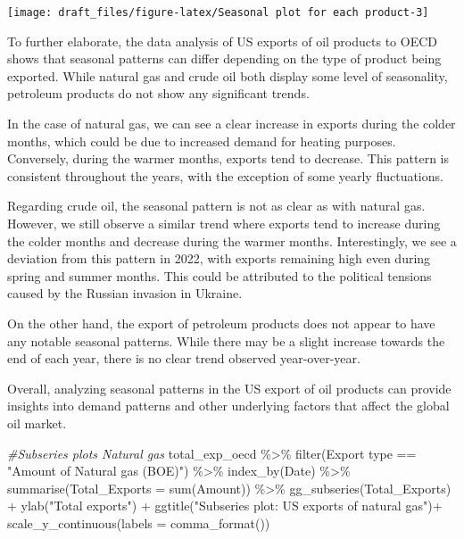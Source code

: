 \documentclass[
]{article}
\newenvironment{Shaded}{\begin{snugshade}}{\end{snugshade}}
\newcommand{\AttributeTok}[1]{\textcolor[rgb]{0.77,0.63,0.00}{#1}}
\newcommand{\CommentTok}[1]{\textcolor[rgb]{0.56,0.35,0.01}{\textit{#1}}}
\newcommand{\FunctionTok}[1]{\textcolor[rgb]{0.00,0.00,0.00}{#1}}
\newcommand{\NormalTok}[1]{#1}
\newcommand{\SpecialCharTok}[1]{\textcolor[rgb]{0.00,0.00,0.00}{#1}}
\newcommand{\StringTok}[1]{\textcolor[rgb]{0.31,0.60,0.02}{#1}}
\begin{document}
\begin{center}\texttt{[image: draft\_files/figure-latex/Seasonal plot for each product-3]} \end{center}

To further elaborate, the data analysis of US exports of oil products to
OECD shows that seasonal patterns can differ depending on the type of
product being exported. While natural gas and crude oil both display
some level of seasonality, petroleum products do not show any
significant trends.

In the case of natural gas, we can see a clear increase in exports
during the colder months, which could be due to increased demand for
heating purposes. Conversely, during the warmer months, exports tend to
decrease. This pattern is consistent throughout the years, with the
exception of some yearly fluctuations.

Regarding crude oil, the seasonal pattern is not as clear as with
natural gas. However, we still observe a similar trend where exports
tend to increase during the colder months and decrease during the warmer
months. Interestingly, we see a deviation from this pattern in 2022,
with exports remaining high even during spring and summer months. This
could be attributed to the political tensions caused by the Russian
invasion in Ukraine.

On the other hand, the export of petroleum products does not appear to
have any notable seasonal patterns. While there may be a slight increase
towards the end of each year, there is no clear trend observed
year-over-year.

Overall, analyzing seasonal patterns in the US export of oil products
can provide insights into demand patterns and other underlying factors
that affect the global oil market.

\begin{Shaded}
\begin{Highlighting}[]
\CommentTok{\#Subseries plots Natural gas}
\NormalTok{total\_exp\_oecd }\SpecialCharTok{\%\textgreater{}\%} \FunctionTok{filter}\NormalTok{(}\StringTok{\textasciigrave{}}\AttributeTok{Export type}\StringTok{\textasciigrave{}} \SpecialCharTok{==} \StringTok{"Amount of Natural gas (BOE)"}\NormalTok{) }\SpecialCharTok{\%\textgreater{}\%} 
  \FunctionTok{index\_by}\NormalTok{(Date) }\SpecialCharTok{\%\textgreater{}\%} 
  \FunctionTok{summarise}\NormalTok{(}\AttributeTok{Total\_Exports =} \FunctionTok{sum}\NormalTok{(}\StringTok{\textasciigrave{}}\AttributeTok{Amount}\StringTok{\textasciigrave{}}\NormalTok{)) }\SpecialCharTok{\%\textgreater{}\%} 
  \FunctionTok{gg\_subseries}\NormalTok{(Total\_Exports) }\SpecialCharTok{+} 
  \FunctionTok{ylab}\NormalTok{(}\StringTok{"Total exports"}\NormalTok{) }\SpecialCharTok{+} 
  \FunctionTok{ggtitle}\NormalTok{(}\StringTok{"Subseries plot: US exports of natural gas"}\NormalTok{)}\SpecialCharTok{+}
  \FunctionTok{scale\_y\_continuous}\NormalTok{(}\AttributeTok{labels =} \FunctionTok{comma\_format}\NormalTok{())}
\end{Highlighting}
\end{Shaded}
\end{document}
